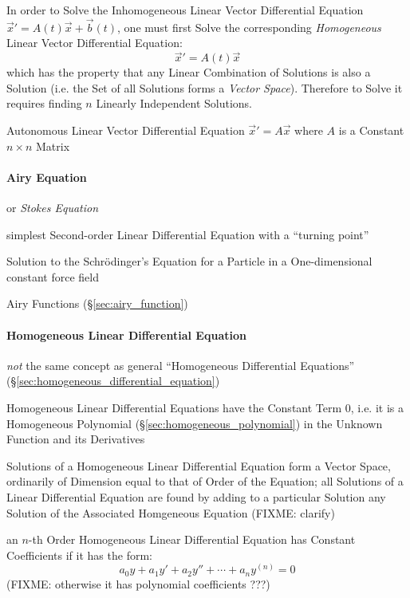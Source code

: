 In order to Solve the Inhomogeneous Linear Vector Differential Equation
$\vec{x}' = A(t)\vec{x} + \vec{b}(t)$, one must first Solve the corresponding
\emph{Homogeneous} Linear Vector Differential Equation:
\[
  \vec{x}' = A(t)\vec{x}
\]
which has the property that any Linear Combination of Solutions is also a
Solution (i.e. the Set of all Solutions forms a \emph{Vector Space}). Therefore
to Solve it requires finding $n$ Linearly Independent Solutions.

Autonomous Linear Vector Differential Equation $\vec{x}' = A\vec{x}$ where $A$
is a Constant $n\times{n}$ Matrix



\paragraph{Airy Equation}\label{sec:airy_equation}\hfill

or \emph{Stokes Equation}

simplest Second-order Linear Differential Equation with a ``turning point''

Solution to the Schr\"odinger's Equation for a Particle in a One-dimensional
constant force field

Airy Functions (\S\ref{sec:airy_function})



\paragraph{Homogeneous Linear Differential Equation}
\label{sec:homogeneous_linear_differential}\hfill

\emph{not} the same concept as general ``Homogeneous Differential Equations''
(\S\ref{sec:homogeneous_differential_equation})

Homogeneous Linear Differential Equations have the Constant Term $0$, i.e. it
is a Homogeneous Polynomial (\S\ref{sec:homogeneous_polynomial}) in the Unknown
Function and its Derivatives

Solutions of a Homogeneous Linear Differential Equation form a Vector Space,
ordinarily of Dimension equal to that of Order of the Equation; all Solutions
of a Linear Differential Equation are found by adding to a particular Solution
any Solution of the Associated Homgeneous Equation (FIXME: clarify)

an $n$-th Order Homogeneous Linear Differential Equation has Constant
Coefficients if it has the form:
\[
  a_0y + a_1y' + a_2y'' + \cdots + a_ny^{(n)} = 0
\]
(FIXME: otherwise it has polynomial coefficients ???)

